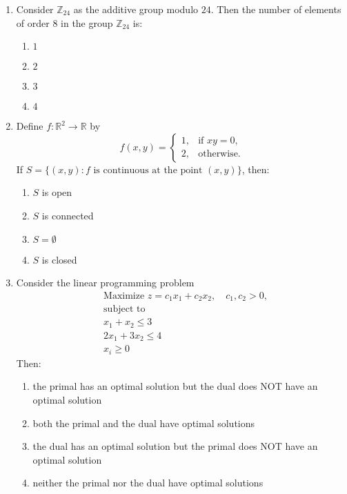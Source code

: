 \documentclass[journal]{IEEEtran}
\numberwithin{equation}{enumi}
\numberwithin{figure}{enumi}
\begin{document}
\begin{enumerate}
\item Consider $\mathbb{Z}_{24}$ as the additive group modulo $24$. Then the number of elements of order $8$ in the group $\mathbb{Z}_{24}$ is:
\hfill{}
\begin{multicols}{4}
\begin{enumerate}
    \item $1$
    \item $2$
    \item $3$
    \item $4$
\end{enumerate}
\end{multicols}

 
\item Define $f : \mathbb{R}^2 \to \mathbb{R}$ by
\[
f(x, y) =
\begin{cases}
1, & \text{if } xy = 0, \\
2, & \text{otherwise}.
\end{cases}
\]
If $S = \{(x, y) : f \text{ is continuous at the point } (x, y)\}$, then:
\hfill{}

\begin{enumerate}
    \item $S$ is open
    \item $S$ is connected
    \item $S = \emptyset$
    \item $S$ is closed
\end{enumerate}
    



\item Consider the linear programming problem
\[
\begin{aligned}
& \text{Maximize } z = c_1 x_1 + c_2 x_2, \quad c_1, c_2 > 0, \\
& \text{subject to} \\
& x_1 + x_2 \le 3 \\
& 2x_1 + 3x_2 \le 4 \\
& x_i \ge 0
\end{aligned}
\]
Then:
\hfill{}

\begin{enumerate}
    
\item  the primal has an optimal solution but the dual does NOT have an optimal solution
\item  both the primal and the dual have optimal solutions
\item the dual has an optimal solution but the primal does NOT have an optimal solution
\item neither the primal nor the dual have optimal solutions
\end{enumerate}


\end{enumerate}
\end{document}
